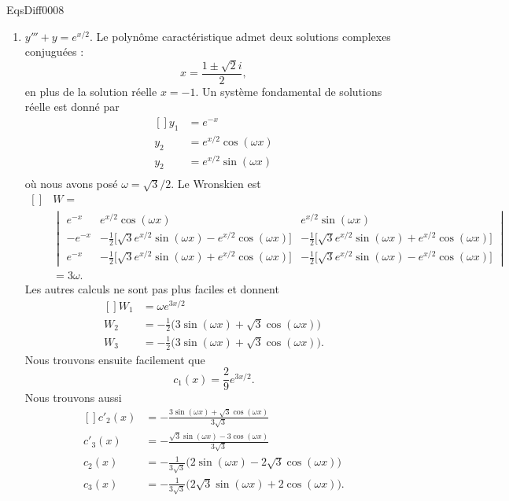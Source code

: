 \begin{corrige}{EqsDiff0008}
\begin{enumerate}
\item
$y'''+y= e^{x/2}$. Le polynôme caractéristique admet deux solutions complexes conjuguées :
\begin{equation}
	x=\frac{ 1\pm\sqrt{2}i }{ 2 },
\end{equation}
en plus de la solution réelle $x=-1$. Un système fondamental de solutions réelle est donné par
\begin{equation}
	\begin{aligned}[]
		y_1&= e^{-x}\\
		y_2&= e^{x/2}\cos(\omega x)\\
		y_2&= e^{x/2}\sin(\omega x)\\
	\end{aligned}
\end{equation}
où nous avons posé $\omega=\sqrt{3}/2$. Le Wronskien est
\begin{equation}
	\begin{aligned}[]
	&W=\\
	&\begin{vmatrix}
   e^{-x} 	&	 e^{x/2}\cos(\omega x)	&	 e^{x/2}\sin(\omega x)\\ 
  - e^{-x}	&	 -\frac{ 1 }{2}\big[ \sqrt{3} e^{x/2}\sin(\omega x)- e^{x/2}\cos(\omega x)\big]	& -\frac{ 1 }{2}\big[\sqrt{3} e^{x/2}\sin(\omega x)+ e^{x/2}\cos(\omega x)\big]\\ 
  e^{-x}	&	 -\frac{ 1 }{2}\big[ \sqrt{3} e^{x/2}\sin(\omega x)+ e^{x/2}\cos(\omega x)\big]	& 	 -\frac{ 1 }{2}\big[ \sqrt{3} e^{x/2}\sin(\omega x)- e^{x/2}\cos(\omega x)\big]	  
\end{vmatrix}\\
		&=3\omega.
	\end{aligned}
\end{equation}
Les autres calculs ne sont pas plus faciles et donnent
\begin{equation}
	\begin{aligned}[]
		W_1&=\omega e^{3x/2}\\
		W_2&=-\frac{ 1 }{2}\big( 3\sin(\omega x)+\sqrt{3}\cos(\omega x) \big)\\
		W_3&=-\frac{ 1 }{2}\big( 3\sin(\omega x)+\sqrt{3}\cos(\omega x) \big).
	\end{aligned}
\end{equation}
Nous trouvons ensuite facilement que
\begin{equation}
	c_1(x)=\frac{ 2 }{ 9 } e^{3x/2}.
\end{equation}
Nous trouvons aussi
\begin{equation}
	\begin{aligned}[]
		c'_2(x)&=-\frac{ 3\sin(\omega x)+\sqrt{3}\cos(\omega x) }{ 3\sqrt{3} }\\
		c'_3(x)&=-\frac{ \sqrt{3}\sin(\omega x)-3\cos(\omega x) }{ 3\sqrt{3} }\\
		c_2(x)&=-\frac{1}{ 3\sqrt{3} }\big( 2\sin(\omega x)-2\sqrt{3}\cos(\omega x) \big)\\
		c_3(x)&=-\frac{1}{ 3\sqrt{3} }\big( 2\sqrt{3}\sin(\omega x)+2\cos(\omega x) \big).
	\end{aligned}
\end{equation}
\end{enumerate}

\end{corrige}
